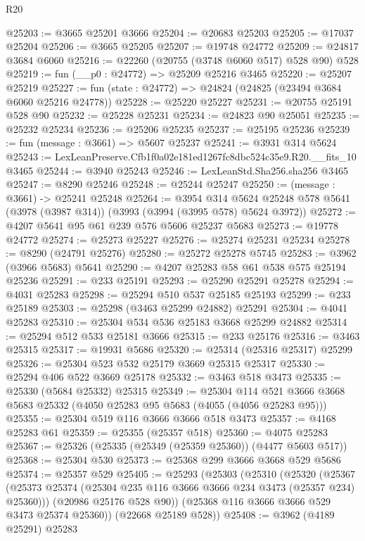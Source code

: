 \begin{lexlean}{R20}
\begin{coremodule}
@25203 := @3665 @25201 @3666
@25204 := @20683 @25203
@25205 := @17037 @25204
@25206 := @3665 @25205
@25207 := @19748 @24772
@25209 := @24817 @3684 @6060
@25216 := @22260 (@20755 (@3748 @6060 @517) @528 @90) @528
@25219 := fun (__p0 : @24772) => @25209 @25216 @3465
@25220 := @25207 @25219
@25227 := fun (state : @24772) => @24824 (@24825 (@23494 @3684 @6060 @25216 @24778))
@25228 := @25220 @25227
@25231 := @20755 @25191 @528 @90
@25232 := @25228 @25231
@25234 := @24823 @90 @25051
@25235 := @25232 @25234
@25236 := @25206 @25235
@25237 := @25195 @25236
@25239 := fun (message : @3661) => @5607 @25237
@25241 := @3931 @314 @5624
@25243 := LexLeanPreserve.Cfb1f0a02e181ed1267fc8dbc524c35e9.R20.__fits_10 @3465
@25244 := @3940 @25243
@25246 := LexLeanStd.Sha256.sha256 @3465
@25247 := @8290 @25246
@25248 := @25244 @25247
@25250 := (message : @3661) -> @25241 @25248
@25264 := @3954
    @314
    @5624
    @25248
    @578
    @5641
    (@3978 (@3987 @314))
    (@3993 (@3994 (@3995 @578) @5624 @3972))
@25272 := @4207 @5641 @95 @61 @239 @576 @5606 @25237 @5683
@25273 := @19778 @24772
@25274 := @25273 @25227
@25276 := @25274 @25231 @25234
@25278 := @8290 (@24791 @25276)
@25280 := @25272 @25278 @5745
@25283 := @3962 (@3966 @5683) @5641
@25290 := @4207 @25283 @58 @61 @538 @575 @25194 @25236
@25291 := @233 @25191
@25293 := @25290 @25291 @25278
@25294 := @4031 @25283
@25298 := @25294 @510 @537 @25185 @25193
@25299 := @233 @25189
@25303 := @25298 (@3463 @25299 @24882) @25291
@25304 := @4041 @25283
@25310 := @25304 @534 @536 @25183 @3668 @25299 @24882
@25314 := @25294 @512 @533 @25181 @3666
@25315 := @233 @25176
@25316 := @3463 @25315
@25317 := @19931 @5686
@25320 := @25314 (@25316 @25317) @25299
@25326 := @25304 @523 @532 @25179 @3669 @25315 @25317
@25330 := @25294 @406 @522 @3669 @25178
@25332 := @3463 @518 @3473
@25335 := @25330 (@5684 @25332) @25315
@25349 := @25304
    @114
    @521
    @3666
    @3668
    @5683
    @25332
    (@4050 @25283 @95 @5683 (@4055 (@4056 @25283 @95)))
@25355 := @25304 @519 @116 @3666 @3666 @518 @3473
@25357 := @4168 @25283 @61
@25359 := @25355 (@25357 @518)
@25360 := @4075 @25283
@25367 := @25326 (@25335 (@25349 (@25359 @25360)) (@4477 @5603 @517))
@25368 := @25304 @530
@25373 := @25368 @299 @3666 @3668 @529 @5686
@25374 := @25357 @529
@25405 := @25293
    (@25303
      (@25310
        (@25320
          (@25367 (@25373 @25374 (@25304 @235 @116 @3666 @3666 @234 @3473 (@25357 @234) @25360)))
          (@20986 @25176 @528 @90))
        (@25368 @116 @3666 @3666 @529 @3473 @25374 @25360))
      (@22668 @25189 @528))
@25408 := @3962 (@4189 @25291) @25283

\end{coremodule}
\end{lexlean}
